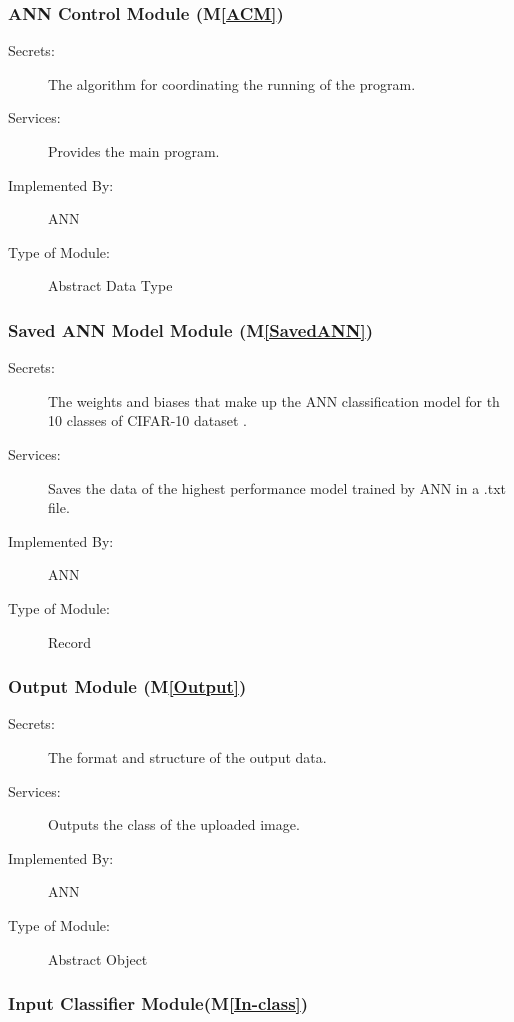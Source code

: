 \documentclass[12pt, titlepage]{article}
\newcommand{\mref}[1]{M\ref{#1}}
\begin{document}
\subsubsection{ANN Control Module (\mref{ACM})}

\begin{description}
\item[Secrets:]The algorithm for coordinating the running of the program.
\item[Services:]Provides the main program.
\item[Implemented By:] ANN
\item[Type of Module:] Abstract Data Type
\end{description}

\subsubsection{Saved ANN Model Module (\mref{SavedANN})}

\begin{description}
  \item[Secrets:]The weights and biases that make up the ANN classification model for th 10
  classes of CIFAR-10 dataset \cite{CIFAR10}.
  \item[Services:]Saves the data of the highest performance model trained by ANN in 
  a .txt file.
  \item[Implemented By:] ANN
  \item[Type of Module:] Record
  \end{description}

\subsubsection{Output Module (\mref{Output})}

\begin{description}
\item[Secrets:]The format and structure of the output data.
\item[Services:]Outputs the class of the uploaded image.
\item[Implemented By:] ANN
\item[Type of Module:] Abstract Object
\end{description}

\subsubsection{Input Classifier Module(\mref{In-class})}
\end{document}
